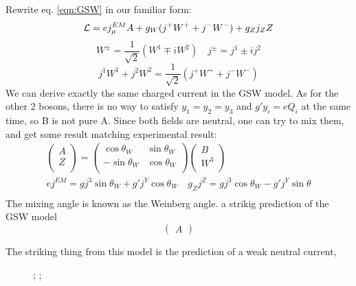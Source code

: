 Rewrite eq. \ref{eqn:GSW} in our familiar form:
\begin{equation}
    \mathcal{L} = ej_\mu^{EM}A + g_W (j^+W^+ + j^- W^-) + g_Z j_Z Z
\end{equation}
\begin{equation}
    W^\pm = \frac{1}{\sqrt{2}}(W^1 \mp iW^2)	\quad
    j^\pm = j^1 \pm ij^2
\end{equation}
\begin{equation}
    j^1W^1 + j^2W^2 = \frac{1}{\sqrt{2}}(j^+W^+ + j^-W^-)
\end{equation}
We can derive exactly the same charged current in the GSW model. As for the other
2 bosons, there is no way to satisfy $y_1 = y_2 = y_3$ and $g'y_i = eQ_i$ at the 
same time, so B is not pure A. Since both fields are neutral, one can try to mix
them, and get some result matching experimental result:
\begin{equation}
    \begin{gathered}
	\begin{pmatrix}
	    A   \\
	    Z   \\
	\end{pmatrix}
	=
	\begin{pmatrix}
	    \cos\theta_W	& \sin\theta_W	\\
	    -\sin\theta_W	& \cos\theta_W	\\
	\end{pmatrix}
	\begin{pmatrix}
	    B   \\
	    W^3 \\
	\end{pmatrix} \\
	ej^{EM} = gj^3\sin\theta_W + g'j^Y\cos\theta_W	\quad
	g_Zj^{Z} = gj^3\cos\theta_W - g'j^Y\sin\theta	\\
    \end{gathered}
\end{equation}
The mixing angle is known as the Weinberg angle. 
a strikig prediction of the GSW model
\begin{equation}
    \begin{pmatrix}
	A
    \end{pmatrix}
\end{equation}

The striking thing from this model is the prediction of a weak neutral current,

\begin{figure}[h]
    \centering
{};
;
\end{figure}

